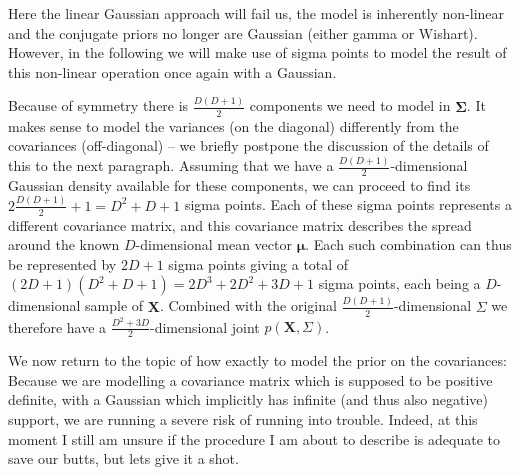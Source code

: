 Here the linear Gaussian approach will fail us, the model is inherently
non-linear and the conjugate priors no longer are Gaussian (either
gamma or Wishart). However, in the following we will make use of sigma
points to model the result of this non-linear operation once again
with a Gaussian.

Because of symmetry there is $\frac{D(D+1)}{2}$ components we need
to model in $\mathbf{\Sigma}$. It makes sense to model the variances
(on the diagonal) differently from the covariances (off-diagonal)
-- we briefly postpone the discussion of the details of this to the
next paragraph. Assuming that we have a $\frac{D(D+1)}{2}$-dimensional
Gaussian density available for these components, we can proceed to
find its $2\frac{D(D+1)}{2}+1=D^{2}+D+1$ sigma points. Each of these
sigma points represents a different covariance matrix, and this covariance
matrix describes the spread around the known $D$-dimensional mean
vector $\mathbf{\mu}$. Each such combination can thus be represented
by $2D+1$ sigma points giving a total of $(2D+1)(D^{2}+D+1)=2D^{3}+2D^{2}+3D+1$
sigma points, each being a $D$-dimensional sample of $\mathbf{X}$.
Combined with the original $\frac{D(D+1)}{2}$-dimensional $\Sigma$
we therefore have a $\frac{D^{2}+3D}{2}$-dimensional joint $p(\mathbf{X},\Sigma)$.

We now return to the topic of how exactly to model the prior on the
covariances: Because we are modelling a covariance matrix which is
supposed to be positive definite, with a Gaussian which implicitly
has infinite (and thus also negative) support, we are running a severe
risk of running into trouble. Indeed, at this moment I still am unsure
if the procedure I am about to describe is adequate to save our butts,
but lets give it a shot.

